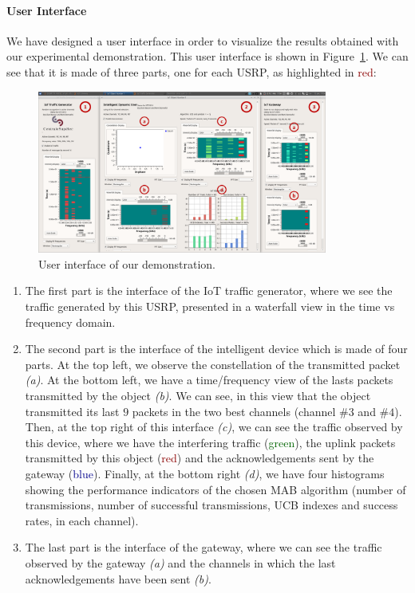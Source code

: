 \paragraph{User Interface}

We have designed a user interface in order to visualize the results obtained  with our experimental demonstration. This user interface is shown in Figure~\ref{fig:42:UI}.
We can see that it is made of three parts, one for each USRP, as highlighted in \textcolor{darkred}{red}:

\begin{figure}[!t]
    \centering
    \includegraphics[width=0.85\textwidth]{UI.eps}
    \caption{User interface of our demonstration.}
    \label{fig:42:UI}
\end{figure}


\begin{enumerate}[leftmargin=6mm]
    \item[(1)]
The first part is the interface of the IoT traffic generator, where we see the traffic generated by this USRP, presented in a waterfall view in the time vs frequency domain.

    \item[(2)]
The second part is the interface of the intelligent device which is made of four parts.
At the top left, we observe the constellation of the transmitted packet \emph{(a)}.
At the bottom left, we have a time/frequency view of the lasts packets transmitted by the object \emph{(b)}.
We can see, in this view that the object transmitted its last $9$ packets in the two best channels (channel $\#3$ and $\#4$).
Then, at the top right of this interface \emph{(c)}, we can see the traffic observed by this device, where we have the interfering traffic (\textcolor{darkgreen}{green}), the uplink packets transmitted by this object (\textcolor{darkred}{red}) and the acknowledgements sent by the gateway (\textcolor{darkblue}{blue}).
Finally, at the bottom right \emph{(d)}, we have four histograms showing the performance indicators of the chosen MAB algorithm (number of transmissions, number of successful transmissions, UCB indexes and success rates, in each channel).

    \item[(3)]
The last part is the interface of the gateway, where we can see the traffic observed by the gateway \emph{(a)} and the channels in which the last acknowledgements have been sent \emph{(b)}.
\end{enumerate}


